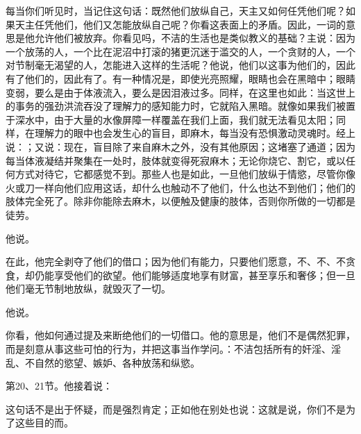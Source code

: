 每当你们听见时，当记住这句话：既然他们放纵自己，天主又如何任凭他们呢？如果天主任凭他们，他们又怎能放纵自己呢？你看这表面上的矛盾。因此，一词的意思是他允许他们被放弃。你看见吗，不洁的生活也是类似教义的基础？主说：因为一个放荡的人，一个比在泥沼中打滚的猪更沉迷于滥交的人，一个贪财的人，一个对节制毫无渴望的人，怎能进入这样的生活呢？他说，他们以这事为他们的，因此有了他们的，因此有了。有一种情况是，即使光亮照耀，眼睛也会在黑暗中；眼睛变弱，要么是由于体液流入，要么是因泪液过多。同样，在这里也如此：当这世上的事务的强劲洪流吞没了理解力的感知能力时，它就陷入黑暗。就像如果我们被置于深水中，由于大量的水像屏障一样覆盖在我们上面，我们就无法看见太阳；同样，在理解力的眼中也会发生心的盲目，即麻木，每当没有恐惧激动灵魂时。经上说：；又说：现在，盲目除了来自麻木之外，没有其他原因；这堵塞了通道；因为每当体液凝结并聚集在一处时，肢体就变得死寂麻木；无论你烧它、割它，或以任何方式对待它，它都感觉不到。那些人也是如此，一旦他们放纵于情慾，尽管你像火或刀一样向他们应用这话，却什么也触动不了他们，什么也达不到他们；他们的肢体完全死了。除非你能除去麻木，以便触及健康的肢体，否则你所做的一切都是徒劳。\par

他说。\par

在此，他完全剥夺了他们的借口；因为他们有能力，只要他们愿意，不、不、不贪食，却仍能享受他们的欲望。他们能够适度地享有财富，甚至享乐和奢侈；但一旦他们毫无节制地放纵，就毁灭了一切。\par

他说。\par

你看，他如何通过提及来断绝他们的一切借口。他的意思是，他们不是偶然犯罪，而是刻意从事这些可怕的行为，并把这事当作学问。：不洁包括所有的奸淫、淫乱、不自然的慾望、嫉妒、各种放荡和纵慾。\par

第20、21节。他接着说：\par

这句话不是出于怀疑，而是强烈肯定；正如他在别处也说：这就是说，你们不是为了这些目的而。\par

